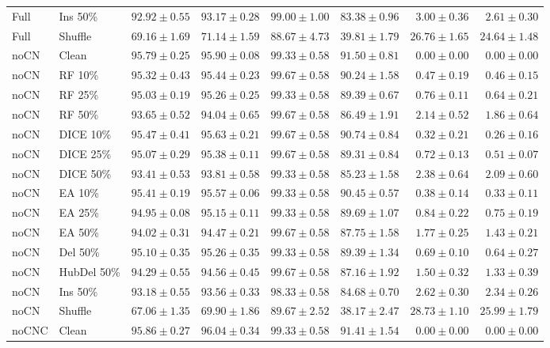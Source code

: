 {\begin{longtable}{llrrrrrr}
Full & Ins 50\% & $92.92\pm0.55$ & $93.17\pm0.28$ & $99.00\pm1.00$ & $83.38\pm0.96$ & $3.00\pm0.36$ & $2.61\pm0.30$ \\
Full & Shuffle & $69.16\pm1.69$ & $71.14\pm1.59$ & $88.67\pm4.73$ & $39.81\pm1.79$ & $26.76\pm1.65$ & $24.64\pm1.48$ \\
noCN & Clean & $95.79\pm0.25$ & $95.90\pm0.08$ & $99.33\pm0.58$ & $91.50\pm0.81$ & $0.00\pm0.00$ & $0.00\pm0.00$ \\
noCN & RF 10\% & $95.32\pm0.43$ & $95.44\pm0.23$ & $99.67\pm0.58$ & $90.24\pm1.58$ & $0.47\pm0.19$ & $0.46\pm0.15$ \\
noCN & RF 25\% & $95.03\pm0.19$ & $95.26\pm0.25$ & $99.33\pm0.58$ & $89.39\pm0.67$ & $0.76\pm0.11$ & $0.64\pm0.21$ \\
noCN & RF 50\% & $93.65\pm0.52$ & $94.04\pm0.65$ & $99.67\pm0.58$ & $86.49\pm1.91$ & $2.14\pm0.52$ & $1.86\pm0.64$ \\
noCN & DICE 10\% & $95.47\pm0.41$ & $95.63\pm0.21$ & $99.67\pm0.58$ & $90.74\pm0.84$ & $0.32\pm0.21$ & $0.26\pm0.16$ \\
noCN & DICE 25\% & $95.07\pm0.29$ & $95.38\pm0.11$ & $99.67\pm0.58$ & $89.31\pm0.84$ & $0.72\pm0.13$ & $0.51\pm0.07$ \\
noCN & DICE 50\% & $93.41\pm0.53$ & $93.81\pm0.58$ & $99.33\pm0.58$ & $85.23\pm1.58$ & $2.38\pm0.64$ & $2.09\pm0.60$ \\
noCN & EA 10\% & $95.41\pm0.19$ & $95.57\pm0.06$ & $99.33\pm0.58$ & $90.45\pm0.57$ & $0.38\pm0.14$ & $0.33\pm0.11$ \\
noCN & EA 25\% & $94.95\pm0.08$ & $95.15\pm0.11$ & $99.33\pm0.58$ & $89.69\pm1.07$ & $0.84\pm0.22$ & $0.75\pm0.19$ \\
noCN & EA 50\% & $94.02\pm0.31$ & $94.47\pm0.21$ & $99.67\pm0.58$ & $87.75\pm1.58$ & $1.77\pm0.25$ & $1.43\pm0.21$ \\
noCN & Del 50\% & $95.10\pm0.35$ & $95.26\pm0.35$ & $99.33\pm0.58$ & $89.39\pm1.34$ & $0.69\pm0.10$ & $0.64\pm0.27$ \\
noCN & HubDel 50\% & $94.29\pm0.55$ & $94.56\pm0.45$ & $99.67\pm0.58$ & $87.16\pm1.92$ & $1.50\pm0.32$ & $1.33\pm0.39$ \\
noCN & Ins 50\% & $93.18\pm0.55$ & $93.56\pm0.33$ & $98.33\pm0.58$ & $84.68\pm0.70$ & $2.62\pm0.30$ & $2.34\pm0.26$ \\
noCN & Shuffle & $67.06\pm1.35$ & $69.90\pm1.86$ & $89.67\pm2.52$ & $38.17\pm2.47$ & $28.73\pm1.10$ & $25.99\pm1.79$ \\
noCNC & Clean & $95.86\pm0.27$ & $96.04\pm0.34$ & $99.33\pm0.58$ & $91.41\pm1.54$ & $0.00\pm0.00$ & $0.00\pm0.00$ \\

\end{longtable}}
